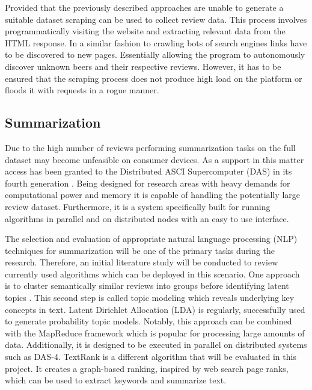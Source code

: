 Provided that the previously described approaches are unable to generate a suitable dataset scraping can be used to collect review data.
This process involves programmatically visiting the website and extracting relevant data from the HTML response.
In a similar fashion to crawling bots of search engines links have to be discovered to new pages.
Essentially allowing the program to autonomously discover unknown beers and their respective reviews.
However, it has to be ensured that the scraping process does not produce high load on the platform or floods it with requests in a rogue manner.

\subsection{Summarization}
Due to the high number of reviews performing summarization tasks on the full dataset may become unfeasible on consumer devices.
As a support in this matter access has been granted to the Distributed ASCI Supercomputer (DAS) in its fourth generation \cite{Bal2016}.
Being designed for research areas with heavy demands for computational power and memory it is capable of handling the potentially large review dataset.
Furthermore, it is a system specifically built for running algorithms in parallel and on distributed nodes with an easy to use interface.

The selection and evaluation of appropriate natural language processing (NLP) techniques for summarization will be one of the primary tasks during the research.
Therefore, an initial literature study will be conducted to review currently used algorithms which can be deployed in this scenario.
One approach is to cluster semantically similar reviews into groups before identifying latent topics \cite{Nagwani2015}.
This second step is called topic modeling which reveals underlying key concepts in text.
Latent Dirichlet Allocation (LDA) \cite{Blei2003} is regularly, successfully \cite{Nagwani2015, Ren2013} used to generate probability topic models.
Notably, this approach can be combined with the MapReduce framework \cite{Nagwani2015} which is popular for processing large amounts of data.
Additionally, it is designed to be executed in parallel on distributed systems such as DAS-4.
TextRank \cite{Mihalcea2004} is a different algorithm that will be evaluated in this project.
It creates a graph-based ranking, inspired by web search page ranks, which can be used to extract keywords and summarize text.

